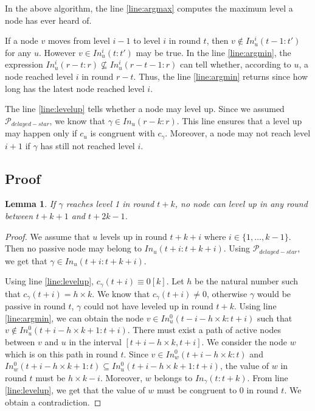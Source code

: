 \documentclass[11pt,letterpaper]{article}
\newtheorem{lem}[thm]{Lemma}
\newcommand{\cent}{\gamma}
\begin{document}
In the above algorithm, the line \ref{line:argmax} computes the maximum level a node has ever heard of.

If a node $v$ moves from level $i-1$ to level $i$ in round $t$, then $v \notin In_u^i(t-1:t')$ for any $u$. However $v \in In_u^i(t:t')$ may be true.
In the line \ref{line:argmin}, the expression $In_u^i(r-t:r) \nsubseteq In_u^i(r-t-1:r)$ can tell whether, according to $u$, a node reached level $i$ in round $r-t$.
Thus, the line \ref{line:argmin} returns since how long has the latest node reached level $i$.

The line \ref{line:levelup} tells whether a node may level up.
Since we assumed $\mathcal{P}_{delayed-star}$, we know that $\cent \in In_u(r-k:r)$.
This line ensures that a level up may happen only if $c_u$ is congruent with $c_\cent$. Moreover, a node may not reach level $i+1$ if $\cent$ has still not reached level $i$.

\subsection{Proof}

\begin{lem} \label{lem:no-close-levelup}
	If $\cent$ reaches level 1 in round $t+k$, no node can level up in any round between $t+k+1$ and $t+2k-1$.
\end{lem}
\begin{proof}
	We assume that $u$ levels up in round $t+k+i$ where $i \in \{1, \dots, k-1\}$.
	Then no passive node may belong to $In_u(t+i:t+k+i)$.
	Using $\mathcal{P}_{delayed-star}$, we get that $\cent \in In_u(t+i:t+k+i)$.

	Using line \ref{line:levelup}, $c_\cent(t+i) \equiv 0 [k]$. Let $h$ be the natural number such that $c_\cent(t+i) = h \times k$.
	We know that $c_\cent(t+i) \neq 0$, otherwise $\cent$ would be passive in round $t$, $\cent$ could not have leveled up in round $t+k$.
	Using line \ref{line:argmin}, we can obtain the node $v \in In_u^0(t-i-h\times k:t+i)$ such that $v \notin In_u^0(t+i-h\times k+1:t+i)$.
	There must exist a path of active nodes between $v$ and $u$ in the interval $[t+i-h\times k, t+i]$.
	We consider the node $w$ which is on this path in round $t$.
	Since $v \in In_w^0(t+i-h\times k:t)$ and $In_w^0(t+i-h\times k+1:t) \subseteq In_u^0(t+i-h\times k+1:t+i)$,
	the value of $w$ in round $t$ must be $h\times k - i$.
	Moreover, $w$ belongs to $In_\cent(t:t+k)$. From line \ref{line:levelup}, we get that the value of $w$ must be congruent to 0 in round $t$.
	We obtain a contradiction.
\end{proof}
\end{document}
